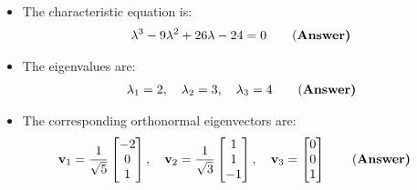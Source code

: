 \begin{itemize}
    \item The characteristic equation is:
    \begin{align*}
        \lambda^3 - 9\lambda^2 + 26\lambda - 24 = 0\qquad\text{(\bf Answer)}
    \end{align*}
    \item The eigenvalues are:
    \begin{align*}
        \lambda_1 = 2, \quad \lambda_2 = 3, \quad \lambda_3 = 4\qquad\text{(\bf Answer)}
    \end{align*}
    \item The corresponding orthonormal eigenvectors are:
    \begin{align*}
        \mathbf{v}_1 &= \frac{1}{\sqrt{5}} \begin{bmatrix}
        -2 \\
        0 \\
        1
    \end{bmatrix}, \quad
    \mathbf{v}_2 = \frac{1}{\sqrt{3}} \begin{bmatrix}
    1 \\
    1 \\
    -1
    \end{bmatrix}, \quad
    \mathbf{v}_3 = \begin{bmatrix}
    0 \\
    0 \\
    1
    \end{bmatrix}\qquad\text{(\bf Answer)}
    \end{align*}
\end{itemize}